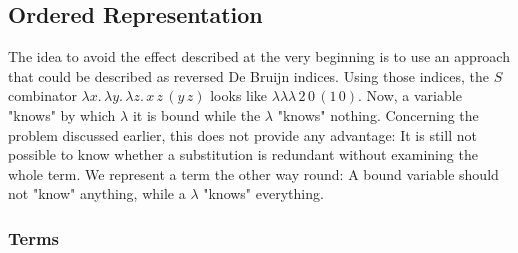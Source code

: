 \documentclass[12pt, a4paper, titlepage]{article}
\newcommand{\sspace}{\,}
\newcommand{\la}{\lambda}
\newcommand{\ApA}[2]{#1 \sspace #2}
\newcommand{\LaA}[2]{\la {#1}. \sspace #2}
\newcommand{\pa}[1]{\left( #1 \right)}
\begin{document}
\subsection{Ordered Representation}

The idea to avoid the effect described at the very beginning is to use an approach that could be described as reversed De Bruijn indices. 
Using those indices, the $S$ combinator $\LaA x {\LaA y {\LaA z {\ApA x z \sspace \pa {\ApA y z}}}}$ looks like $\la \la \la\sspace {\ApA 2 0} \sspace \pa{\ApA 1 0}$. Now, a variable "knows" by which $\la$ it is bound while the $\la$ "knows" nothing. Concerning the problem discussed earlier, this does not provide any advantage: It is still not possible to know whether a substitution is redundant without examining the whole term. We represent a term the other way round: A bound variable should not "know" anything, while a $\la$ "knows" everything. 


\subsubsection{Terms}
\end{document}
